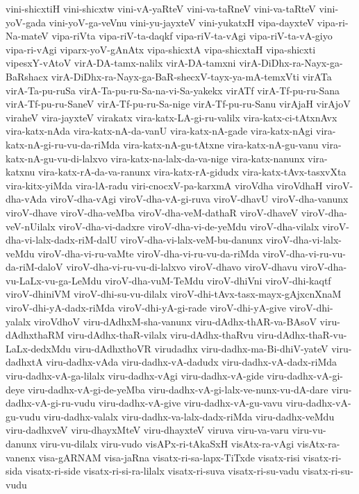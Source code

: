 {vini-shicxtiH
vini-shicxtw
vini-vA-yaRteV
vini-va-taRneV
vini-va-taRteV
vini-yoV-gada
vini-yoV-ga-veVnu
vini-yu-jayxteV
vini-yukatxH
vipa-dayxteV
vipa-ri-Na-mateV
vipa-riVta
vipa-riV-ta-daqkf
vipa-riV-ta-vAgi
vipa-riV-ta-vA-giyo
vipa-ri-vAgi
viparx-yoV-gAnAtx
vipa-shicxtA
vipa-shicxtaH
vipa-shicxti
vipesxY-vAtoV
virA-DA-tamx-nalilx
virA-DA-tamxni
virA-DiDhx-ra-Nayx-ga-BaRshacx
virA-DiDhx-ra-Nayx-ga-BaR-shecxV-tayx-ya-mA-temxVti
virATa
virA-Ta-pu-ruSa
virA-Ta-pu-ru-Sa-na-vi-Sa-yakekx
virATf
virA-Tf-pu-ru-Sana
virA-Tf-pu-ru-SaneV
virA-Tf-pu-ru-Sa-nige
virA-Tf-pu-ru-Sanu
virAjaH
virAjoV
viraheV
vira-jayxteV
virakatx
vira-katx-LA-gi-ru-valilx
vira-katx-ci-tAtxnAvx
vira-katx-nAda
vira-katx-nA-da-vanU
vira-katx-nA-gade
vira-katx-nAgi
vira-katx-nA-gi-ru-vu-da-riMda
vira-katx-nA-gu-tAtxne
vira-katx-nA-gu-vanu
vira-katx-nA-gu-vu-di-lalxvo
vira-katx-na-lalx-da-va-nige
vira-katx-nanunx
vira-katxnu
vira-katx-rA-da-va-ranunx
vira-katx-rA-gidudx
vira-katx-tAvx-tasxvXta
vira-kitx-yiMda
vira-lA-radu
viri-cnocxV-pa-karxmA
viroVdha
viroVdhaH
viroV-dha-vAda
viroV-dha-vAgi
viroV-dha-vA-gi-ruva
viroV-dhavU
viroV-dha-vanunx
viroV-dhave
viroV-dha-veMba
viroV-dha-veM-dathaR
viroV-dhaveV
viroV-dha-veV-nUilalx
viroV-dha-vi-dadxre
viroV-dha-vi-de-yeMdu
viroV-dha-vilalx
viroV-dha-vi-lalx-dadx-riM-dalU
viroV-dha-vi-lalx-veM-bu-danunx
viroV-dha-vi-lalx-veMdu
viroV-dha-vi-ru-vaMte
viroV-dha-vi-ru-vu-da-riMda
viroV-dha-vi-ru-vu-da-riM-daloV
viroV-dha-vi-ru-vu-di-lalxvo
viroV-dhavo
viroV-dhavu
viroV-dha-vu-LaLx-vu-ga-LeMdu
viroV-dha-vuM-TeMdu
viroV-dhiVni
viroV-dhi-kaqtf
viroV-dhiniVM
viroV-dhi-su-vu-dilalx
viroV-dhi-tAvx-tasx-mayx-gAjxcnXnaM
viroV-dhi-yA-dadx-riMda
viroV-dhi-yA-gi-rade
viroV-dhi-yA-give
viroV-dhi-yalalx
viroVdhoV
viru-dAdhxM-sha-vanunx
viru-dAdhx-thAR-va-BAsoV
viru-dAdhxthaRM
viru-dAdhx-thaR-vilalx
viru-dAdhx-thaRvu
viru-dAdhx-thaR-vu-LaLx-dedxMdu
viru-dAdhxthoVR
virudadhx
viru-dadhx-ma-Bi-dhiV-yateV
viru-dadhxtA
viru-dadhx-vAda
viru-dadhx-vA-dadudx
viru-dadhx-vA-dadx-riMda
viru-dadhx-vA-ga-lilalx
viru-dadhx-vAgi
viru-dadhx-vA-gide
viru-dadhx-vA-gi-deye
viru-dadhx-vA-gi-de-yeMba
viru-dadhx-vA-gi-lalx-ve-nunx-vu-dA-dare
viru-dadhx-vA-gi-ru-vudu
viru-dadhx-vA-give
viru-dadhx-vA-gu-vavu
viru-dadhx-vA-gu-vudu
viru-dadhx-valalx
viru-dadhx-va-lalx-dadx-riMda
viru-dadhx-veMdu
viru-dadhxveV
viru-dhayxMteV
viru-dhayxteV
viruva
viru-va-varu
viru-vu-danunx
viru-vu-dilalx
viru-vudo
visAPx-ri-tAkaSxH
visAtx-ra-vAgi
visAtx-ra-vanenx
visa-gARNAM
visa-jaRna
visatx-ri-sa-lapx-TiTxde
visatx-risi
visatx-ri-sida
visatx-ri-side
visatx-ri-si-ra-lilalx
visatx-ri-suva
visatx-ri-su-vadu
visatx-ri-su-vudu
}
